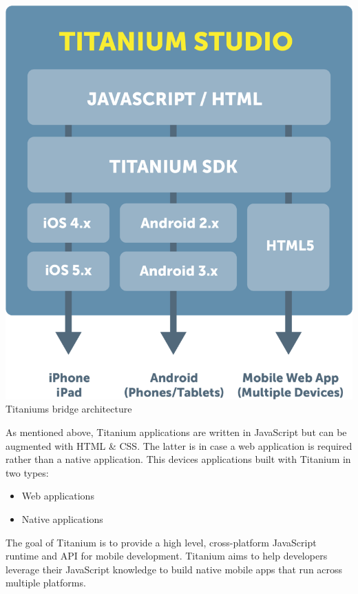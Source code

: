 \begin{centering}
	\includegraphics[scale=0.25]{images/titanium_architecture.png}\\{Titaniums bridge architecture\cite{Inc2012a}}\\
\end{centering}

As mentioned above, Titanium applications are written in JavaScript but can be augmented with HTML \& CSS. The latter is in case a web application is required rather than a native application. This devices applications built with Titanium in two types:
\begin{itemize}
	\item
	Web applications
	\item
	Native applications
\end{itemize}

The goal of Titanium is to provide a high level, cross-platform JavaScript runtime and API for mobile development.\cite{Whinnery2012} Titanium aims to help developers leverage their JavaScript knowledge to build native mobile apps that run across multiple platforms.

